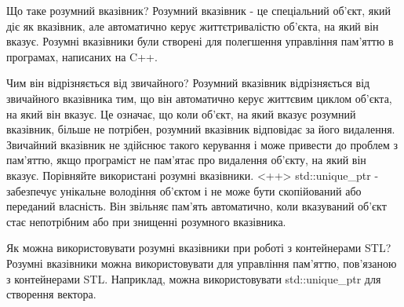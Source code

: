 \documentclass[a4paper, 12pt, oneside]{extarticle}
\begin{document}
\begin{itemize}
	\question Що таке розумний вказівник?
	\answer Розумний вказівник - це спеціальний об'єкт, який діє як вказівник, але автоматично керує життєтривалістю об'єкта, на який він вказує. Розумні вказівники були створені для полегшення управління пам'яттю в програмах, написаних на C++.

	\question Чим він відрізняється від звичайного?
	\answer Розумний вказівник відрізняється від звичайного вказівника тим, що він автоматично керує життєвим циклом об'єкта, на який він вказує. Це означає, що коли об'єкт, на який вказує розумний вказівник, більше не потрібен, розумний вказівник відповідає за його видалення. Звичайний вказівник не здійснює такого керування і може привести до проблем з пам'яттю, якщо програміст не пам'ятає про видалення об'єкту, на який він вказує.
	\question Порівняйте використані розумні вказівники. <++>
	\answer %
std::unique_ptr - забезпечує унікальне володіння об'єктом і не може бути скопійований або переданий власність. Він звільняє пам'ять автоматично, коли вказуваний об'єкт стає непотрібним або при знищенні розумного вказівника.

	\question Як можна використовувати розумні вказівники при роботі з контейнерами STL?
	\answer Розумні вказівники можна використовувати для управління пам'яттю, пов'язаною з контейнерами STL. Наприклад, можна використовувати std::unique_ptr для створення вектора.
\end{itemize}
\end{document}
